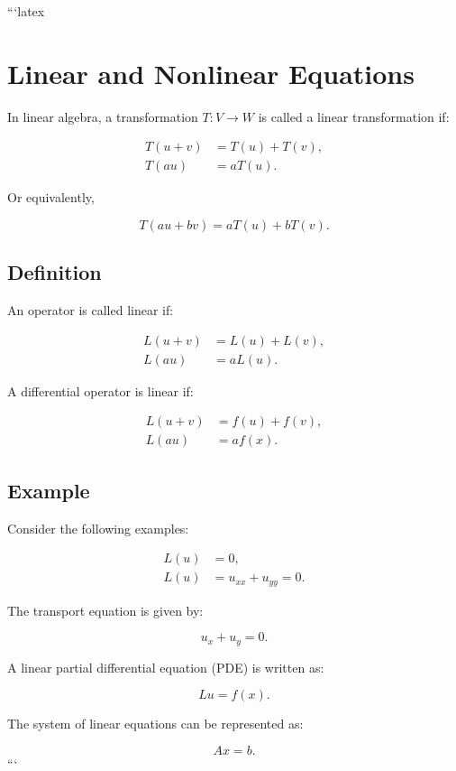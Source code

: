 ```latex
\section*{Linear and Nonlinear Equations}

In linear algebra, a transformation \( T: V \to W \) is called a linear transformation if:

\begin{align}
    T(u + v) &= T(u) + T(v), \\
    T(au) &= aT(u).
\end{align}

Or equivalently,

\begin{equation}
    T(au + bv) = aT(u) + bT(v).
\end{equation}

\subsection*{Definition}

An operator is called linear if:

\begin{align}
    L(u + v) &= L(u) + L(v), \\
    L(au) &= aL(u).
\end{align}

A differential operator is linear if:

\begin{align}
    L(u + v) &= f(u) + f(v), \\
    L(au) &= af(x).
\end{align}

\subsection*{Example}

Consider the following examples:

\begin{align}
    L(u) &= 0, \\
    L(u) &= u_{xx} + u_{yy} = 0.
\end{align}

The transport equation is given by:

\begin{equation}
    u_x + u_y = 0.
\end{equation}

A linear partial differential equation (PDE) is written as:

\begin{equation}
    Lu = f(x).
\end{equation}

The system of linear equations can be represented as:

\begin{equation}
    Ax = b.
\end{equation}
```
